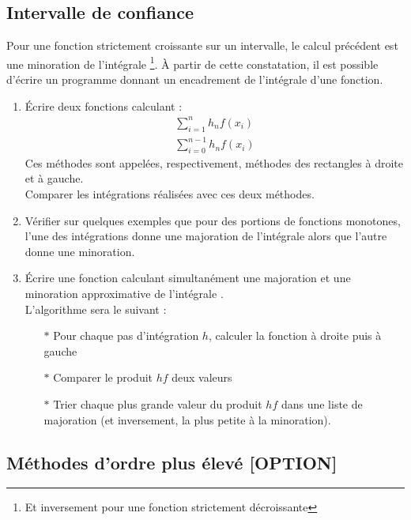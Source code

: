 \subsection{Intervalle de confiance}
Pour une fonction strictement croissante  sur un intervalle, le calcul
précédent  est une  minoration  de l'intégrale \footnote{Et inversement pour  une
fonction strictement décroissante}. À  partir de cette constatation, il
est  possible   d'écrire  un  programme  donnant   un  encadrement  de
l'intégrale d'une fonction.
\begin{enumerate}
\item Écrire deux fonctions calculant :
  \begin{eqnarray*}
    \sum_{i=1}^n h_n f(x_i)\\ \sum_{i=0}^{n-1}h_n f(x_i)
  \end{eqnarray*}
  Ces méthodes sont appelées,  respectivement, méthodes des rectangles
  à droite et  à gauche.  \\ Comparer les  intégrations réalisées avec
  ces deux méthodes.
  
\item  Vérifier  sur  quelques  exemples  que  pour  des  portions  de
  fonctions monotones, l'une des  intégrations donne une majoration de
  l'intégrale alors que l'autre donne une minoration.  %
\item Écrire  une fonction  calculant simultanément une  majoration et
  une       minoration        approximative       de       l'intégrale
  .\\ L'algorithme sera le suivant :
  \begin{itemize}
  \item[$\ast$]  Pour  chaque  pas   d'intégration  $h$,  calculer  la
    fonction à droite puis à gauche
  \item[$\ast$] Comparer le produit $hf$ deux valeurs
  \item[$\ast$] Trier chaque  plus grande valeur du  produit $hf$ dans
    une  liste de  majoration (et  inversement,  la plus  petite à  la
    minoration).
\end{itemize}
  
\end{enumerate}

\subsection{Méthodes d'ordre plus élevé [OPTION]}


